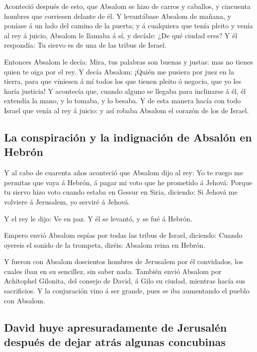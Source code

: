  Aconteció después de esto, que Absalom se hizo de carros y
caballos, y cincuenta hombres que corriesen delante de él. 
Y levantábase Absalom de mañana, y poníase á un lado del camino de la
puerta; y á cualquiera que tenía pleito y venía al rey á juicio, Absalom
le llamaba á sí, y decíale: ¿De qué ciudad eres? Y él respondía: Tu
siervo es de una de las tribus de Israel.

 Entonces Absalom le decía: Mira, tus palabras son buenas y
justas: mas no tienes quien te oiga por el rey.  Y decía
Absalom: ¡Quién me pusiera por juez en la tierra, para que viniesen á mí
todos los que tienen pleito ó negocio, que yo les haría justicia!
 Y acontecía que, cuando alguno se llegaba para inclinarse á
él, él extendía la mano, y lo tomaba, y lo besaba.  Y de
esta manera hacía con todo Israel que venía al rey á juicio: y así
robaba Absalom el corazón de los de Israel.

\hypertarget{la-conspiraciuxf3n-y-la-indignaciuxf3n-de-absaluxf3n-en-hebruxf3n}{%
\subsection{La conspiración y la indignación de Absalón en
Hebrón}\label{la-conspiraciuxf3n-y-la-indignaciuxf3n-de-absaluxf3n-en-hebruxf3n}}

 Y al cabo de cuarenta años aconteció que Absalom dijo al
rey: Yo te ruego me permitas que vaya á Hebrón, á pagar mi voto que he
prometido á Jehová:  Porque tu siervo hizo voto cuando
estaba en Gessur en Siria, diciendo: Si Jehová me volviere á Jerusalem,
yo serviré á Jehová.

 Y el rey le dijo: Ve en paz. Y él se levantó, y se fué á
Hebrón.

 Empero envió Absalom espías por todas las tribus de
Israel, diciendo: Cuando oyereis el sonido de la trompeta, diréis:
Absalom reina en Hebrón.

 Y fueron con Absalom doscientos hombres de Jerusalem por
él convidados, los cuales iban en su sencillez, sin saber nada.
 También envió Absalom por Achitophel Gilonita, del consejo
de David, á Gilo su ciudad, mientras hacía sus sacrificios. Y la
conjuración vino á ser grande, pues se iba aumentando el pueblo con
Absalom.

\hypertarget{david-huye-apresuradamente-de-jerusaluxe9n-despuuxe9s-de-dejar-atruxe1s-algunas-concubinas}{%
\subsection{David huye apresuradamente de Jerusalén después de dejar
atrás algunas
concubinas}\label{david-huye-apresuradamente-de-jerusaluxe9n-despuuxe9s-de-dejar-atruxe1s-algunas-concubinas}}

